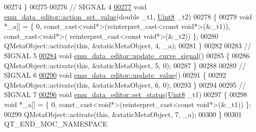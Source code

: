 \begin{DoxyCode}
00274 \}
00275 
00276 \textcolor{comment}{// SIGNAL 4}
\hypertarget{a00065_source_l00277}{}\hyperlink{a00008_a7c1fa0d7d1623b11d4badceb1854010e}{00277} \textcolor{keywordtype}{void} \hyperlink{a00008_a7c1fa0d7d1623b11d4badceb1854010e}{emu\_data\_editor::action\_set\_value}(\textcolor{keywordtype}{double} \_t1, 
      \hyperlink{a00004_a979e3e23b9a449e69ab6a8a83b6042f8}{Uint8} \_t2)
00278 \{
00279     \textcolor{keywordtype}{void} *\_a[] = \{ 0, \textcolor{keyword}{const\_cast<}\textcolor{keywordtype}{void}*\textcolor{keyword}{>}(\textcolor{keyword}{reinterpret\_cast<}\textcolor{keyword}{const }\textcolor{keywordtype}{void}*\textcolor{keyword}{>}(&\_t1)), \textcolor{keyword}{const\_cast<}\textcolor{keywordtype}{void}*\textcolor{keyword}{>}(\textcolor{keyword}{
      reinterpret\_cast<}\textcolor{keyword}{const }\textcolor{keywordtype}{void}*\textcolor{keyword}{>}(&\_t2)) \};
00280     QMetaObject::activate(\textcolor{keyword}{this}, &staticMetaObject, 4, \_a);
00281 \}
00282 
00283 \textcolor{comment}{// SIGNAL 5}
\hypertarget{a00065_source_l00284}{}\hyperlink{a00008_a7dfbddd62d6782b0f0ce809cbf2338ba}{00284} \textcolor{keywordtype}{void} \hyperlink{a00008_a7dfbddd62d6782b0f0ce809cbf2338ba}{emu\_data\_editor::update\_curve\_signal}()
00285 \{
00286     QMetaObject::activate(\textcolor{keyword}{this}, &staticMetaObject, 5, 0);
00287 \}
00288 
00289 \textcolor{comment}{// SIGNAL 6}
\hypertarget{a00065_source_l00290}{}\hyperlink{a00008_ad5f20fdbb4731185020ff4e90cd1ead2}{00290} \textcolor{keywordtype}{void} \hyperlink{a00008_ad5f20fdbb4731185020ff4e90cd1ead2}{emu\_data\_editor::update\_value}()
00291 \{
00292     QMetaObject::activate(\textcolor{keyword}{this}, &staticMetaObject, 6, 0);
00293 \}
00294 
00295 \textcolor{comment}{// SIGNAL 7}
\hypertarget{a00065_source_l00296}{}\hyperlink{a00008_a9476424a86a6ed4f84c64d0ac77143cc}{00296} \textcolor{keywordtype}{void} \hyperlink{a00008_a9476424a86a6ed4f84c64d0ac77143cc}{emu\_data\_editor::set\_status}(\hyperlink{a00004_a979e3e23b9a449e69ab6a8a83b6042f8}{Uint8} \_t1)
00297 \{
00298     \textcolor{keywordtype}{void} *\_a[] = \{ 0, \textcolor{keyword}{const\_cast<}\textcolor{keywordtype}{void}*\textcolor{keyword}{>}(\textcolor{keyword}{reinterpret\_cast<}\textcolor{keyword}{const }\textcolor{keywordtype}{void}*\textcolor{keyword}{>}(&\_t1)) \};
00299     QMetaObject::activate(\textcolor{keyword}{this}, &staticMetaObject, 7, \_a);
00300 \}
00301 QT\_END\_MOC\_NAMESPACE
\end{DoxyCode}
